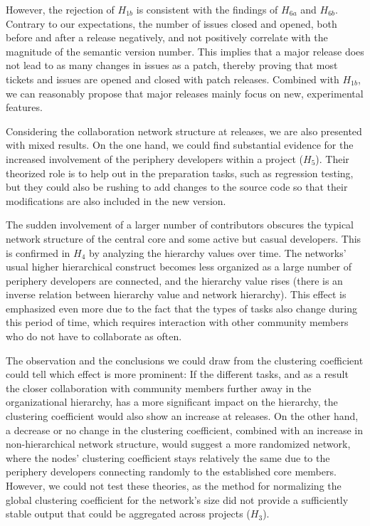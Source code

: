 However, the rejection of $H_{1b}$ is consistent with the findings of $H_{6a}$ and $H_{6b}$. Contrary to our expectations, the number of issues closed and opened, both before and after a release negatively, and not positively correlate with the magnitude of the semantic version number. This implies that a major release does not lead to as many changes in issues as a patch, thereby proving that most tickets and issues are opened and closed with patch releases. Combined with $H_{1b}$, we can reasonably propose that major releases mainly focus on new, experimental features.

Considering the collaboration network structure at releases, we are also presented with mixed results. On the one hand, we could find substantial evidence for the increased involvement of the periphery developers within a project ($H_5$). Their theorized role is to help out in the preparation tasks, such as regression testing, but they could also be rushing to add changes to the source code so that their modifications are also included in the new version.

The sudden involvement of a larger number of contributors obscures the typical network structure of the central core and some active but casual developers. This is confirmed in $H_4$ by analyzing the hierarchy values over time. The networks' usual higher hierarchical construct becomes less organized as a large number of periphery developers are connected, and the hierarchy value rises (there is an inverse relation between hierarchy value and network hierarchy). This effect is emphasized even more due to the fact that the types of tasks also change during this period of time, which requires interaction with other community members who do not have to collaborate as often.

The observation and the conclusions we could draw from the clustering coefficient could tell which effect is more prominent: If the different tasks, and as a result the closer collaboration with community members further away in the organizational hierarchy, has a more significant impact on the hierarchy, the clustering coefficient would also show an increase at releases. On the other hand, a decrease or no change in the clustering coefficient, combined with an increase in non-hierarchical network structure, would suggest a more randomized network, where the nodes' clustering coefficient stays relatively the same due to the periphery developers connecting randomly to the established core members. However, we could not test these theories, as the method for normalizing the global clustering coefficient for the network's size did not provide a sufficiently stable output that could be aggregated across projects ($H_3$). 

